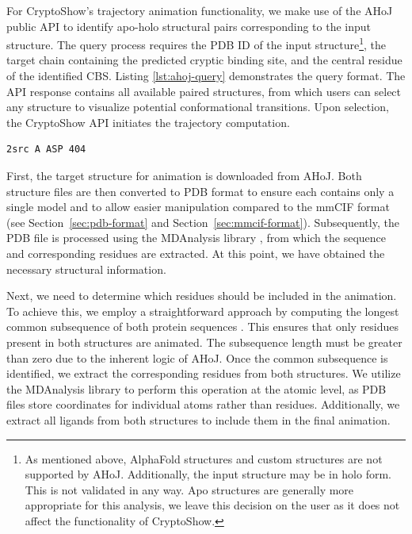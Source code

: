 For CryptoShow's trajectory animation functionality, we make use of the AHoJ public API to identify apo-holo structural pairs corresponding to the input structure. The query process requires the PDB ID of the input structure\footnote{As mentioned above, AlphaFold structures and custom structures are not supported by AHoJ. Additionally, the input structure may be in holo form. This is not validated in any way. Apo structures are generally more appropriate for this analysis, we leave this decision on the user as it does not affect the functionality of CryptoShow.}, the target chain containing the predicted cryptic binding site, and the central residue of the identified CBS. Listing \ref{lst:ahoj-query} demonstrates the query format. The API response contains all available paired structures, from which users can select any structure to visualize potential conformational transitions. Upon selection, the CryptoShow API initiates the trajectory computation.

\begin{lstlisting}[caption={Sample query format for the AHoJ tool, specifying PDB ID 2src, chain A, aspartic acid residue at position 404}, label={lst:ahoj-query}]
    2src A ASP 404
\end{lstlisting}

First, the target structure for animation is downloaded from AHoJ. Both structure files are then converted to PDB format to ensure each contains only a single model and to allow easier manipulation compared to the mmCIF format (see Section~\ref{sec:pdb-format} and Section~\ref{sec:mmcif-format}). Subsequently, the PDB file is processed using the MDAnalysis library \cite{gowers2019mdanalysis}, from which the sequence and corresponding residues are extracted. At this point, we have obtained the necessary structural information.

Next, we need to determine which residues should be included in the animation. To achieve this, we employ a straightforward approach by computing the longest common subsequence of both protein sequences . This ensures that only residues present in both structures are animated. The subsequence length must be greater than zero due to the inherent logic of AHoJ. Once the common subsequence is identified, we extract the corresponding residues from both structures. We utilize the MDAnalysis library to perform this operation at the atomic level, as PDB files store coordinates for individual atoms rather than residues. Additionally, we extract all ligands from both structures to include them in the final animation.

